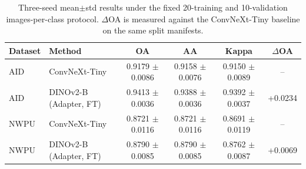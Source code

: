 \begin{table}[t]
  \centering
  \scriptsize
  \setlength{\tabcolsep}{2pt}
  \caption{Three-seed mean$\pm$std results under the fixed 20-training and 10-validation images-per-class protocol. $\Delta$OA is measured against the ConvNeXt-Tiny baseline on the same split manifests.}
  \label{tab:main_results}
  \begin{tabular}{l >{\raggedright\arraybackslash}p{} c c c c}
    \toprule
    Dataset & Method & OA & AA & Kappa & $\Delta$OA \\
    \midrule
    AID & ConvNeXt-Tiny & 0.9179 $\pm$ 0.0086 & 0.9158 $\pm$ 0.0076 & 0.9150 $\pm$ 0.0089 & -- \\
    AID & DINOv2-B (Adapter, FT) & 0.9413 $\pm$ 0.0036 & 0.9388 $\pm$ 0.0036 & 0.9392 $\pm$ 0.0037 & +0.0234 \\
    NWPU & ConvNeXt-Tiny & 0.8721 $\pm$ 0.0116 & 0.8721 $\pm$ 0.0116 & 0.8691 $\pm$ 0.0119 & -- \\
    NWPU & DINOv2-B (Adapter, FT) & 0.8790 $\pm$ 0.0085 & 0.8790 $\pm$ 0.0085 & 0.8762 $\pm$ 0.0087 & +0.0069 \\
    \bottomrule
  \end{tabular}
\end{table}
